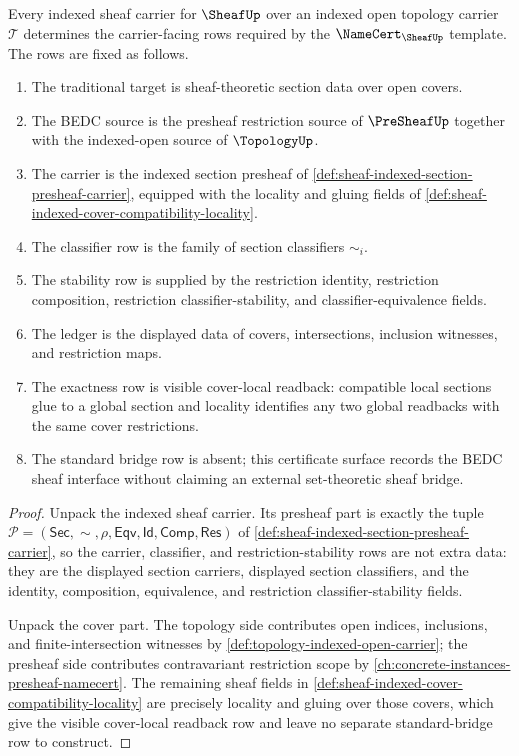 \begin{theorem}
\label{thm:sheaf-namecert-carrier-obligation}
Every indexed sheaf carrier for $\SheafUp$ over an indexed open topology carrier $\mathcal{T}$ determines the carrier-facing rows required by the $\NameCert_{\SheafUp}$ template. The rows are fixed as follows.
\begin{enumerate}
\item The traditional target is sheaf-theoretic section data over open covers.
\item The BEDC source is the presheaf restriction source of $\PreSheafUp$ together with the indexed-open source of $\TopologyUp$.
\item The carrier is the indexed section presheaf of \autoref{def:sheaf-indexed-section-presheaf-carrier}, equipped with the locality and gluing fields of \autoref{def:sheaf-indexed-cover-compatibility-locality}.
\item The classifier row is the family of section classifiers $\sim_i$.
\item The stability row is supplied by the restriction identity, restriction composition, restriction classifier-stability, and classifier-equivalence fields.
\item The ledger is the displayed data of covers, intersections, inclusion witnesses, and restriction maps.
\item The exactness row is visible cover-local readback: compatible local sections glue to a global section and locality identifies any two global readbacks with the same cover restrictions.
\item The standard bridge row is absent; this certificate surface records the BEDC sheaf interface without claiming an external set-theoretic sheaf bridge.
\end{enumerate}
\end{theorem}
\begin{proof}
Unpack the indexed sheaf carrier. Its presheaf part is exactly the tuple $\mathcal{P}=(\mathsf{Sec},\sim,\rho,\mathsf{Eqv},\mathsf{Id},\mathsf{Comp},\mathsf{Res})$ of \autoref{def:sheaf-indexed-section-presheaf-carrier}, so the carrier, classifier, and restriction-stability rows are not extra data: they are the displayed section carriers, displayed section classifiers, and the identity, composition, equivalence, and restriction classifier-stability fields.

Unpack the cover part. The topology side contributes open indices, inclusions, and finite-intersection witnesses by \autoref{def:topology-indexed-open-carrier}; the presheaf side contributes contravariant restriction scope by \autoref{ch:concrete-instances-presheaf-namecert}. The remaining sheaf fields in \autoref{def:sheaf-indexed-cover-compatibility-locality} are precisely locality and gluing over those covers, which give the visible cover-local readback row and leave no separate standard-bridge row to construct.
\end{proof}

